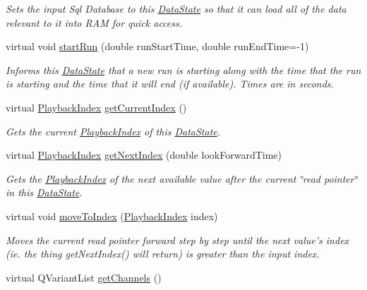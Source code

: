 \begin{DoxyCompactItemize}
\begin{DoxyCompactList}\small\item\em Sets the input Sql Database to this \hyperlink{class_picto_1_1_data_state}{Data\-State} so that it can load all of the data relevant to it into R\-A\-M for quick access. \end{DoxyCompactList}\item 
virtual void \hyperlink{class_picto_1_1_lfp_state_a87e3f6635bf617697b1de6a9113f0dfb}{start\-Run} (double run\-Start\-Time, double run\-End\-Time=-\/1)
\begin{DoxyCompactList}\small\item\em Informs this \hyperlink{class_picto_1_1_data_state}{Data\-State} that a new run is starting along with the time that the run is starting and the time that it will end (if available). Times are in seconds. \end{DoxyCompactList}\item 
virtual \hyperlink{struct_picto_1_1_playback_index}{Playback\-Index} \hyperlink{class_picto_1_1_lfp_state_a3d1801b8b1f428fa5927633cb2fe0d10}{get\-Current\-Index} ()
\begin{DoxyCompactList}\small\item\em Gets the current \hyperlink{struct_picto_1_1_playback_index}{Playback\-Index} of this \hyperlink{class_picto_1_1_data_state}{Data\-State}. \end{DoxyCompactList}\item 
virtual \hyperlink{struct_picto_1_1_playback_index}{Playback\-Index} \hyperlink{class_picto_1_1_lfp_state_ad498c35250a5491f42c57385f0f68da7}{get\-Next\-Index} (double look\-Forward\-Time)
\begin{DoxyCompactList}\small\item\em Gets the \hyperlink{struct_picto_1_1_playback_index}{Playback\-Index} of the next available value after the current \char`\"{}read pointer\char`\"{} in this \hyperlink{class_picto_1_1_data_state}{Data\-State}. \end{DoxyCompactList}\item 
virtual void \hyperlink{class_picto_1_1_lfp_state_acd6593b8cb11d4aa974b629871eab6dd}{move\-To\-Index} (\hyperlink{struct_picto_1_1_playback_index}{Playback\-Index} index)
\begin{DoxyCompactList}\small\item\em Moves the current read pointer forward step by step until the next value's index (ie. the thing get\-Next\-Index() will return) is greater than the input index. \end{DoxyCompactList}\item 
\hypertarget{class_picto_1_1_lfp_state_a78a9ebbf3987f5f7bbbe77b1b5e14a48}{virtual Q\-Variant\-List \hyperlink{class_picto_1_1_lfp_state_a78a9ebbf3987f5f7bbbe77b1b5e14a48}{get\-Channels} ()}\label{class_picto_1_1_lfp_state_a78a9ebbf3987f5f7bbbe77b1b5e14a48}


\end{DoxyCompactItemize}
